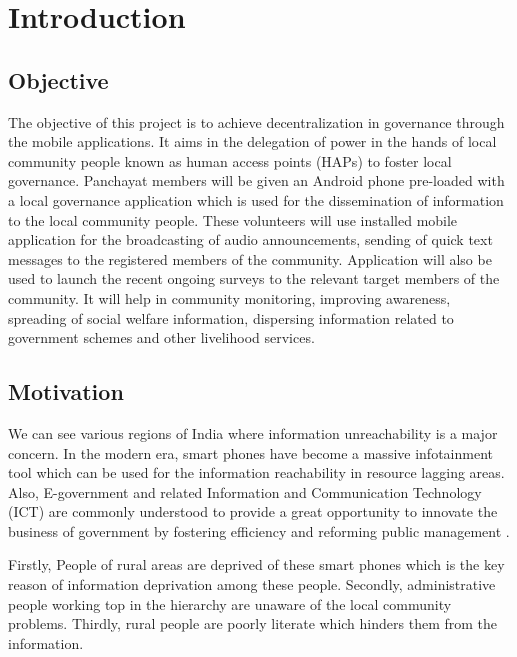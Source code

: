 \chapter{Introduction}


\section{Objective}
The objective of  this project is to achieve decentralization in governance through the mobile applications. It aims in the delegation of power in the hands of local community people known as human access points (HAPs) to foster local governance. Panchayat members will be given an Android phone pre-loaded with a local governance application which is used for the dissemination of information to the local community people. These volunteers will use installed mobile application for the broadcasting of audio announcements, sending of quick text messages to the registered members of the community. Application will also be used to launch the recent ongoing surveys to the relevant target members of the community. It will help in community monitoring, improving awareness, spreading of social welfare information, dispersing information related to government schemes and other livelihood services.

\section{Motivation}
We can see various regions of India where information unreachability is a major concern. In the modern era, smart phones have  become a massive infotainment tool which can be used for the information reachability in resource lagging areas. Also, E-government and related Information and Communication Technology (ICT) are commonly understood to provide a great opportunity to innovate the business of government by fostering efficiency and reforming public management \cite{ict1}.

Firstly, People of rural areas are deprived of these smart phones which is the key reason of information deprivation among these people. Secondly, administrative people working top in the hierarchy are unaware of the local community problems. Thirdly, rural people are poorly literate which hinders them from the information. 

